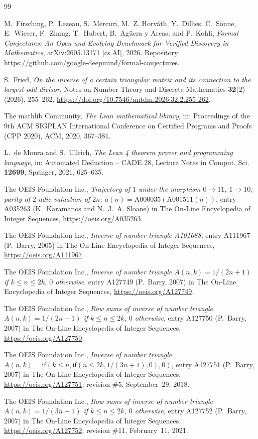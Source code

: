 \documentclass[11pt]{amsart}
\theoremstyle{plain}
\theoremstyle{definition}
\begin{document}
{\small
\begin{thebibliography}{99}

M.~Firsching, P.~Lezeau, S.~Mercuri, M.~Z. Horv\'ath, Y.~Dillies, C.~S\"onne, E.~Wieser, F.~Zhang, T.~Hubert, B.~Ag\"uera y Arcas, and P.~Kohli, \emph{Formal Conjectures: An Open and Evolving Benchmark for Verified Discovery in Mathematics}, arXiv:2605.13171 [cs.AI], 2026. Repository: \url{https://github.com/google-deepmind/formal-conjectures}.

S.~Fried, \emph{On the inverse of a certain triangular matrix and its connection to the largest odd divisor}, Notes on Number Theory and Discrete Mathematics \textbf{32}(2) (2026), 255--262, \url{https://doi.org/10.7546/nntdm.2026.32.2.255-262}.

The mathlib Community, \emph{The Lean mathematical library}, in: Proceedings of the 9th ACM SIGPLAN International Conference on Certified Programs and Proofs (CPP 2020), ACM, 2020, 367--381.

L.~de Moura and S.~Ullrich, \emph{The Lean 4 theorem prover and programming language}, in: Automated Deduction -- CADE 28, Lecture Notes in Comput. Sci. \textbf{12699}, Springer, 2021, 625--635.

The OEIS Foundation Inc., \emph{Trajectory of $1$ under the morphism $0\to11$, $1\to10$; parity of $2$-adic valuation of $2n$: $a(n)=\mathrm{A000035}(\mathrm{A001511}(n))$}, entry A035263 (K.~Karamanos and N.~J.~A. Sloane) in The On-Line Encyclopedia of Integer Sequences, \url{https://oeis.org/A035263}.

The OEIS Foundation Inc., \emph{Inverse of number triangle A101688}, entry A111967 (P.~Barry, 2005) in The On-Line Encyclopedia of Integer Sequences, \url{https://oeis.org/A111967}.

The OEIS Foundation Inc., \emph{Inverse of number triangle $A(n,k)=1/(2n+1)$ if $k\le n\le 2k$, $0$ otherwise}, entry A127749 (P.~Barry, 2007) in The On-Line Encyclopedia of Integer Sequences, \url{https://oeis.org/A127749}.

The OEIS Foundation Inc., \emph{Row sums of inverse of number triangle $A(n,k)=1/(2n+1)$ if $k\le n\le 2k$, $0$ otherwise}, entry A127750 (P.~Barry, 2007) in The On-Line Encyclopedia of Integer Sequences, \url{https://oeis.org/A127750}.

The OEIS Foundation Inc., \emph{Inverse of number triangle $A(n,k)=\mathrm{if}(k\le n,\mathrm{if}(n\le 2k,1/(3n+1),0),0)$}, entry A127751 (P.~Barry, 2007) in The On-Line Encyclopedia of Integer Sequences, \url{https://oeis.org/A127751}; revision \#5, September~29, 2018.

The OEIS Foundation Inc., \emph{Row sums of inverse of number triangle $A(n,k)=1/(3n+1)$ if $k\le n\le 2k$, $0$ otherwise}, entry A127752 (P.~Barry, 2007) in The On-Line Encyclopedia of Integer Sequences, \url{https://oeis.org/A127752}; revision \#11, February~11, 2021.

\end{thebibliography}
}
\end{document}
